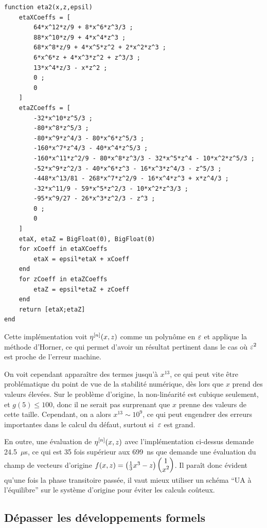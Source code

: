\begin{lstlisting}
function eta2(x,z,epsil)
    etaXCoeffs = [
        64*x^12*z/9 + 8*x^6*z^3/3 ;
        88*x^10*z/9 + 4*x^4*z^3 ;
        68*x^8*z/9 + 4*x^5*z^2 + 2*x^2*z^3 ;
        6*x^6*z + 4*x^3*z^2 + z^3/3 ;
        13*x^4*z/3 - x*z^2 ;
        0 ;
        0
    ]
    etaZCoeffs = [
        -32*x^10*z^5/3 ;
        -80*x^8*z^5/3 ;
        -80*x^9*z^4/3 - 80*x^6*z^5/3 ;
        -160*x^7*z^4/3 - 40*x^4*z^5/3 ;
        -160*x^11*z^2/9 - 80*x^8*z^3/3 - 32*x^5*z^4 - 10*x^2*z^5/3 ;
        -52*x^9*z^2/3 - 40*x^6*z^3 - 16*x^3*z^4/3 - z^5/3 ;
        -448*x^13/81 - 268*x^7*z^2/9 - 16*x^4*z^3 + x*z^4/3 ;
        -32*x^11/9 - 59*x^5*z^2/3 - 10*x^2*z^3/3 ;
        -95*x^9/27 - 26*x^3*z^2/3 - z^3 ;
        0 ;
        0
    ]
    etaX, etaZ = BigFloat(0), BigFloat(0)
    for xCoeff in etaXCoeffs
        etaX = epsil*etaX + xCoeff
    end
    for zCoeff in etaZCoeffs
        etaZ = epsil*etaZ + zCoeff
    end
    return [etaX;etaZ]
end
\end{lstlisting}
%
Cette implémentation voit $\eta^{[n]}(x,z)$ comme un polynôme en $\varepsilon$ et applique la méthode d'Horner, ce qui permet d'avoir un résultat pertinent dans le cas où $\varepsilon^2$ est proche de l'erreur machine. 

On voit cependant apparaître des termes jusqu'à $x^{13}$, ce qui peut vite être problématique du point de vue de la stabilité numérique, dès lors que $x$ prend des valeurs élevées. Sur le problème d'origine, la non-linéarité est cubique seulement, et $g(5) \leq 100$, donc il ne serait pas surprenant que $x$ prenne des valeurs de cette taille. Cependant, on a alors $x^{13} \sim 10^9$, ce qui peut engendrer des erreurs importantes dans le calcul du défaut, surtout si~$\varepsilon$ est grand. 

En outre, une évaluation de $\eta^{[n]} (x,z)$ avec l'implémentation ci-dessus demande 24.5~$\mu$s, ce qui est 35 fois supérieur aux 699~ns que demande une évaluation du champ de vecteurs d'origine $f(x,z) = \left(\frac{1}{3}x^3 - z \right) \begin{pmatrix} 1 \\ x^2 \end{pmatrix}$. Il paraît donc évident qu'une fois la phase transitoire passée, il vaut mieux utiliser un schéma \enquote{UA à l'équilibre} sur le système d'origine pour éviter les calculs coûteux.



\subsection{Dépasser les développements formels}

